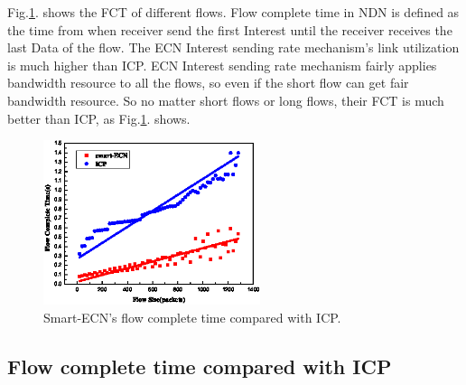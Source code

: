 Fig.\ref{fig-fct}. shows the FCT of different flows. Flow complete time in NDN is defined as the time from when receiver send the first Interest until the receiver receives the last Data of the flow. The ECN Interest sending rate mechanism's link utilization is much higher than ICP. ECN Interest sending rate mechanism fairly applies bandwidth resource to all the flows, so even if the short flow can get fair bandwidth resource. So no matter short flows or long flows, their FCT is much better than ICP, as Fig.\ref{fig-fct}. shows. 
\begin{figure}[t]
\centering
\includegraphics[width=2.5in]{fct-cut.eps}
\centering
\caption{ Smart-ECN's flow complete time compared with ICP.}
\label{fig-fct}
\end{figure}
\subsection{Flow complete time compared with ICP}


